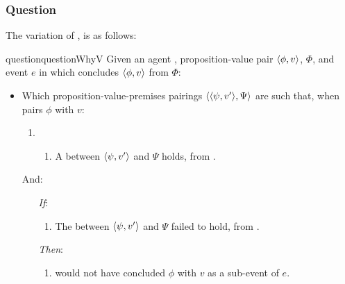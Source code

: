 \subsubsection{Question}
\label{cha:var:sec:vars:qwhyvnp:question}

\begin{note}
  The variation of \qWhy{}, \qWhyV{} is as follows:

  \begin{restatable}[\qWhyV{}]{question}{questionWhyV}
    \label{q:why:v}
    Given an agent \vAgent{}, proposition-value pair \(\langle \phi, v \rangle\), \poP{} \(\Phi\), and event \(e\) in which \vAgent{} concludes \(\langle \phi, v \rangle\) from \(\Phi\):

    \begin{itemize}
    \item
      Which proposition-value-premises pairings \(\langle \langle \psi, v' \rangle, \Psi \rangle\) are such that, when \vAgent{} pairs \(\phi\) with \(v\):

      \begin{enumerate}[label=]
      \item
        \begin{enumerate}[label=\alph*., ref=(\alph*), series=qWhyVdef]
        \item
          \label{q:why:v:a}
          A  between \(\langle \psi, v' \rangle\) and \(\Psi\) holds, from .
        \end{enumerate}
      \end{enumerate}

      And:

      \begin{enumerate}
      \item[\emph{If}:]
        \begin{enumerate}[label=\alph*., ref=(\alph*), resume*=qWhyVdef]
        \item
          \label{q:why:v:if}
          The  between \(\langle \psi, v' \rangle\) and \(\Psi\) failed to hold, from .
        \end{enumerate}
      \item[\emph{Then}:]
        \begin{enumerate}[label=\alph*., ref=(\alph*), resume*=qWhyVdef]
        \item
          \label{q:why:v:then}
          \vAgent{} would not have concluded \(\phi\) with \(v\) as a sub-event of \(e\).
        \end{enumerate}
      \end{enumerate}
    \end{itemize}
    \vspace{-\baselineskip}
  \end{restatable}


\end{note}
